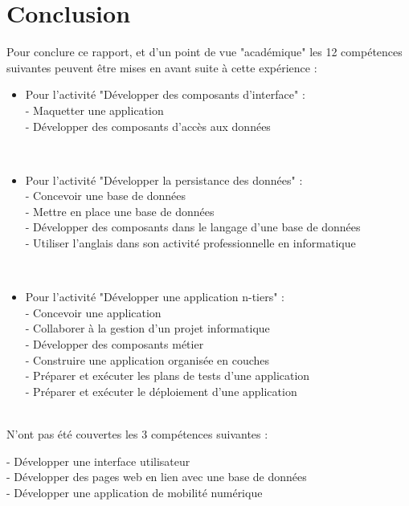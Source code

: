 \chapter{Conclusion}
\label{Conclusion}

Pour conclure ce rapport, et d'un point de vue "académique" les 12 compétences suivantes peuvent être mises en avant suite à cette expérience :
\renewcommand{\labelitemi}{\textbullet}
\\
\begin{itemize}
\item Pour l'activité "Développer des composants d'interface" :\\
- Maquetter une application \\
- Développer des composants d'accès aux données\\
\end{itemize}
\\
\begin{itemize}
\item Pour l'activité "Développer la persistance des données" :\\
- Concevoir une base de données\\
- Mettre en place une base de données\\
- Développer des composants dans le langage d'une base de données \\
- Utiliser l'anglais dans son activité professionnelle en informatique\\
\end{itemize}
\\
\begin{itemize}
\item Pour l'activité "Développer une application n-tiers" :\\
- Concevoir une application\\
- Collaborer à la gestion d'un projet informatique\\
- Développer des composants métier\\
- Construire une application organisée en couches\\
- Préparer et exécuter les plans de tests d'une application\\
- Préparer et exécuter le déploiement d'une application\\
\end{itemize}
\\
N'ont pas été couvertes les 3 compétences suivantes :
\begin{itemize}
- Développer une interface utilisateur \\
- Développer des pages web en lien avec une base de données \\
- Développer une application de mobilité numérique \\
\end{itemize}
